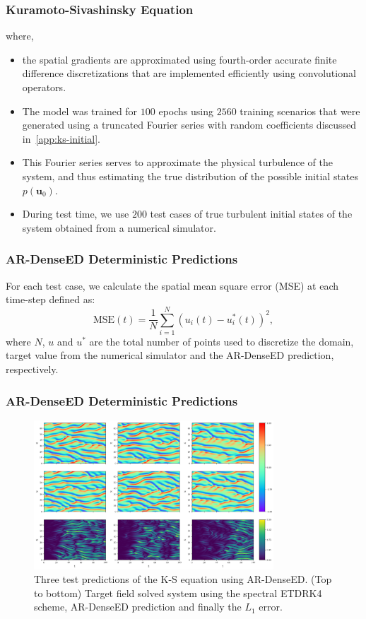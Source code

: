 \documentclass{beamer}
\theoremstyle{remark}
\begin{document}
\begin{frame}
\frametitle{Kuramoto-Sivashinsky Equation}
where,
\begin{itemize}
\item{ the spatial gradients are approximated using fourth-order accurate finite difference discretizations that are implemented efficiently using convolutional operators.}

\item{The model was trained for $100$ epochs using $2560$ training scenarios that were generated using a truncated Fourier series with random coefficients discussed in~\ref{app:ks-initial}.}

\item{This Fourier series serves to approximate the physical turbulence of the system, and thus estimating the true distribution of the possible initial states $p(\bm{u}_{0})$.}

\item{During test time, we use $200$ test cases of true turbulent initial states of the system obtained from a numerical simulator.}

\end{itemize}
\end{frame}

\begin{frame}
\frametitle{AR-DenseED Deterministic Predictions}
For each test case, we calculate the spatial mean square error (MSE) at each time-step defined as:
\begin{equation}
    \textrm{MSE}(t) = \frac{1}{N}\sum^{N}_{i=1}\left(u_{i}(t)-u^{*}_{i}(t)\right)^{2},
    \label{eq:mse}
\end{equation}
where $N$, $u$ and $u^*$ are the total number of points used to discretize the domain, target value from the numerical simulator and the AR-DenseED prediction, respectively.
\end{frame}

\begin{frame}
\frametitle{AR-DenseED Deterministic Predictions}
\begin{figure}[H]
    \centering
    \includegraphics[width=0.8\textwidth]{Fig05.png}
    \caption{Three test predictions of the K-S equation using AR-DenseED. (Top to bottom) Target field solved system using the spectral ETDRK4 scheme, AR-DenseED prediction and finally the $L_1$ error.}
    \label{fig:ks-test-prediction}
\end{figure}
\end{frame}
\end{document}
